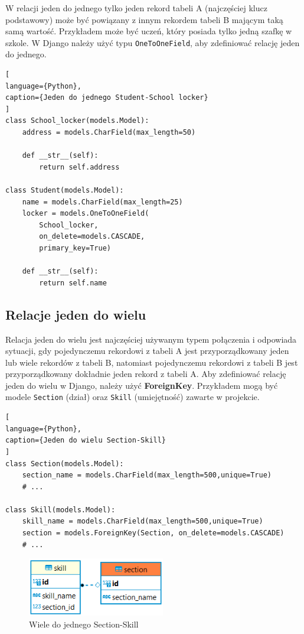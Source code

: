 \documentclass[oneside,polski,logo,indent]{amuthesis}
\begin{document}
W relacji jeden do jednego tylko jeden rekord tabeli A (najczęściej klucz podstawowy) może być powiązany z innym rekordem tabeli B mającym taką samą wartość. Przykładem może być uczeń, który posiada tylko jedną szafkę w szkole.
W Django należy użyć typu \texttt{OneToOneField}, aby zdefiniować relację jeden do jednego.
\begin{lstlisting}[
language={Python},
caption={Jeden do jednego Student-School locker}
]
class School_locker(models.Model):
    address = models.CharField(max_length=50)

    def __str__(self):
        return self.address

class Student(models.Model):
    name = models.CharField(max_length=25)
    locker = models.OneToOneField(
        School_locker,
        on_delete=models.CASCADE,
        primary_key=True)

    def __str__(self):
        return self.name
\end{lstlisting}

\begin{center}
\subsection{Relacje jeden do wielu}
\end{center}

Relacja jeden do wielu jest najczęściej używanym typem połączenia i odpowiada sytuacji, gdy pojedynczemu rekordowi z tabeli A jest przyporządkowany jeden lub wiele rekordów z tabeli B, natomiast pojedynczemu rekordowi z tabeli B jest przyporządkowany dokładnie jeden rekord z tabeli A.
Aby zdefiniować relację jeden do wielu w Django, należy użyć \textbf{ForeignKey}. Przykładem mogą być modele \texttt{Section} (dział) oraz \texttt{Skill} (umiejętność) zawarte w projekcie.
\begin{lstlisting}[
language={Python},
caption={Jeden do wielu Section-Skill}
]
class Section(models.Model):
    section_name = models.CharField(max_length=500,unique=True)
	# ...

class Skill(models.Model):
    skill_name = models.CharField(max_length=500,unique=True)
    section = models.ForeignKey(Section, on_delete=models.CASCADE)
	# ...

\end{lstlisting}

\begin{figure}[H]
  \centering
  \includegraphics[width=6cm]{skillsec.png}
  \caption{Wiele do jednego Section-Skill}
  \label{obraz-przyklad}
\end{figure}
\end{document}
